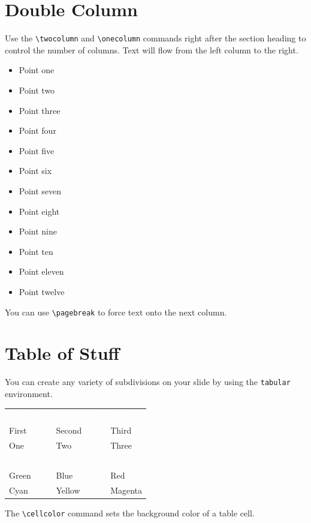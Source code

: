\documentclass{afitdefense}
\begin{document}
\section{Double Column}\twocolumn\raggedright

Use the \verb|\twocolumn| and \verb|\onecolumn| commands right after the section
heading to control the number of columns. Text will flow from the left column to
the right.
\begin{itemize}
    \item Point one
    \item Point two
    \item Point three
    \item Point four
    \item Point five
    \item Point six
    \item Point seven
    \item Point eight
    \item Point nine
    \item Point ten
    \item Point eleven
    \item Point twelve
\end{itemize}
You can use \verb|\pagebreak| to force text onto the next column.

\section{Table of Stuff}

You can create any variety of subdivisions on your slide by using the
\verb|tabular| environment.
\begin{center}
\begin{tabular}{C{0.25\textwidth}cC{0.25\textwidth}cC{0.25\textwidth}}
    \textcolor{white}{Primary} &&
    \textcolor{white}{Secondary} &&
    \textcolor{white}{Tertiary} \\
    First && Second && Third \\
    One && Two && Three \\[1em]
    \textcolor{white}{Alpha} &&
    \textcolor{white}{Beta} &&
    \textcolor{white}{Gamma} \\
    Green && Blue && Red \\
    Cyan && Yellow && Magenta
\end{tabular}
\end{center}
The \verb|\cellcolor| command sets the background color of a table cell.
\end{document}
